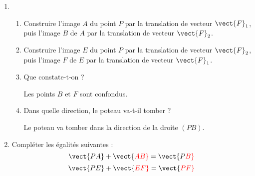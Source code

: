 \documentclass[a4paper]{article}
\begin{document}
\begin{enumerate}
  \item 
    \begin{enumerate}
      \item Construire l'image $A$ du point $P$ par la translation de vecteur $\vect{F}_1$, puis l'image $B$ de $A$ par la translation de vecteur $\vect{F}_2$.
      \item Construire l'image $E$ du point $P$ par la translation de vecteur $\vect{F}_2$, puis l'image $F$ de $E$ par la translation de vecteur $\vect{F}_1$.
      \item Que constate-t-on ?
	\begin{center}
	  {\color{red}Les points $B$ et $F$ sont confondus.}
	\end{center}
      \item Dans quelle direction, le poteau va-t-il tomber ?
	\begin{center}
	  {\color{red}Le poteau va tomber dans la direction de la droite $(PB)$.}
	\end{center}
    \end{enumerate}
  \item Compléter les égalités suivantes :
    \[\vect{PA}+\vect{\color{red}AB}=\vect{P\color{red}B}\]
    \[\vect{PE}+\vect{\color{red}EF}=\vect{\color{red}PF}\]

    \bigskip


\end{enumerate}
\end{document}
